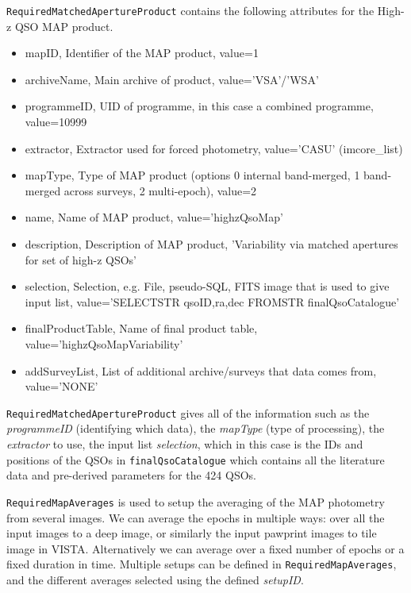 \documentclass[usenatbib]{mnras}
\begin{document}
\verb+RequiredMatchedApertureProduct+ contains the following attributes for the High-z QSO MAP product.
\begin{itemize}
    \item mapID, Identifier of the MAP product, value=1	
    \item archiveName, Main archive of product, value='VSA'/'WSA' 	
    \item programmeID, UID of programme, in this case a combined programme, value=10999
    \item extractor, Extractor used for forced photometry, value='CASU' (imcore_list)
    \item mapType, Type of MAP product (options 0 internal band-merged, 1 band-merged across surveys, 2 multi-epoch), value=2 
    \item name, Name of MAP product, value='highzQsoMap'
    \item description, Description of MAP product, 'Variability via matched apertures for set of high-z QSOs'	
    \item selection, Selection, e.g. File, pseudo-SQL, FITS image that is used to give input list, value='SELECTSTR qsoID,ra,dec FROMSTR finalQsoCatalogue'	
    \item finalProductTable, Name of final product table, value='highzQsoMapVariability'
    \item addSurveyList, List of additional archive/surveys that data comes from, value='NONE'
\end{itemize}
    
\verb+RequiredMatchedApertureProduct+ gives all of the information such as the {\it programmeID} (identifying which data), the {\it mapType} (type of processing), the {\it extractor} to use, the input list {\it selection}, which in this case is the IDs and positions of the QSOs in \verb+finalQsoCatalogue+ which contains all the literature data and pre-derived parameters for the 424 QSOs.   
    
\verb+RequiredMapAverages+ is used to setup the averaging of the MAP photometry from several images. We can average the epochs in multiple ways: over all the input images to a deep image, or similarly the input pawprint images to tile image in VISTA. Alternatively we can average over a fixed number of epochs or a fixed duration in time. Multiple setups can be defined in \verb+RequiredMapAverages+, and the different averages selected using the defined {\it setupID}.
    
\end{document}
